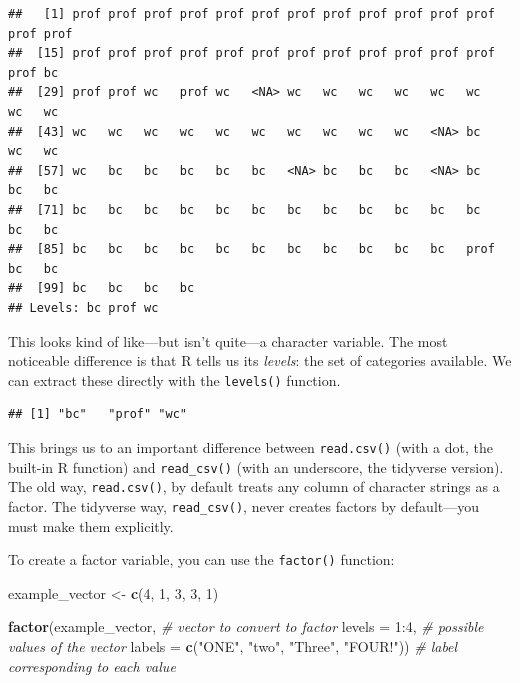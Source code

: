 \documentclass[12pt,oneside,openany]{book}
\newenvironment{Shaded}{\begin{snugshade}}{\end{snugshade}}
\newcommand{\KeywordTok}[1]{\textcolor[rgb]{0.13,0.29,0.53}{\textbf{{#1}}}}
\newcommand{\DataTypeTok}[1]{\textcolor[rgb]{0.13,0.29,0.53}{{#1}}}
\newcommand{\DecValTok}[1]{\textcolor[rgb]{0.00,0.00,0.81}{{#1}}}
\newcommand{\StringTok}[1]{\textcolor[rgb]{0.31,0.60,0.02}{{#1}}}
\newcommand{\CommentTok}[1]{\textcolor[rgb]{0.56,0.35,0.01}{\textit{{#1}}}}
\newcommand{\NormalTok}[1]{{#1}}
\begin{document}
\begin{Shaded}
\end{Shaded}

\begin{verbatim}
##   [1] prof prof prof prof prof prof prof prof prof prof prof prof prof prof
##  [15] prof prof prof prof prof prof prof prof prof prof prof prof prof bc  
##  [29] prof prof wc   prof wc   <NA> wc   wc   wc   wc   wc   wc   wc   wc  
##  [43] wc   wc   wc   wc   wc   wc   wc   wc   wc   wc   <NA> bc   wc   wc  
##  [57] wc   bc   bc   bc   bc   bc   <NA> bc   bc   bc   <NA> bc   bc   bc  
##  [71] bc   bc   bc   bc   bc   bc   bc   bc   bc   bc   bc   bc   bc   bc  
##  [85] bc   bc   bc   bc   bc   bc   bc   bc   bc   bc   bc   prof bc   bc  
##  [99] bc   bc   bc   bc  
## Levels: bc prof wc
\end{verbatim}

This looks kind of like---but isn't quite---a character variable. The
most noticeable difference is that R tells us its \emph{levels}: the set
of categories available. We can extract these directly with the
\texttt{levels()} function.

\begin{Shaded}
\end{Shaded}

\begin{verbatim}
## [1] "bc"   "prof" "wc"
\end{verbatim}

This brings us to an important difference between \texttt{read.csv()}
(with a dot, the built-in R function) and \texttt{read\_csv()} (with an
underscore, the tidyverse version). The old way, \texttt{read.csv()}, by
default treats any column of character strings as a factor. The
tidyverse way, \texttt{read\_csv()}, never creates factors by
default---you must make them explicitly.

To create a factor variable, you can use the \texttt{factor()} function:

\begin{Shaded}
\begin{Highlighting}[]
\NormalTok{example_vector <-}\StringTok{ }\KeywordTok{c}\NormalTok{(}\DecValTok{4}\NormalTok{, }\DecValTok{1}\NormalTok{, }\DecValTok{3}\NormalTok{, }\DecValTok{3}\NormalTok{, }\DecValTok{1}\NormalTok{)}

\KeywordTok{factor}\NormalTok{(example_vector,  }\CommentTok{# vector to convert to factor}
       \DataTypeTok{levels =} \DecValTok{1}\NormalTok{:}\DecValTok{4}\NormalTok{,    }\CommentTok{# possible values of the vector}
       \DataTypeTok{labels =} \KeywordTok{c}\NormalTok{(}\StringTok{"ONE"}\NormalTok{,}
                  \StringTok{"two"}\NormalTok{,}
                  \StringTok{"Three"}\NormalTok{,}
                  \StringTok{"FOUR!"}\NormalTok{))  }\CommentTok{# label corresponding to each value}
\end{Highlighting}
\end{Shaded}
\end{document}
